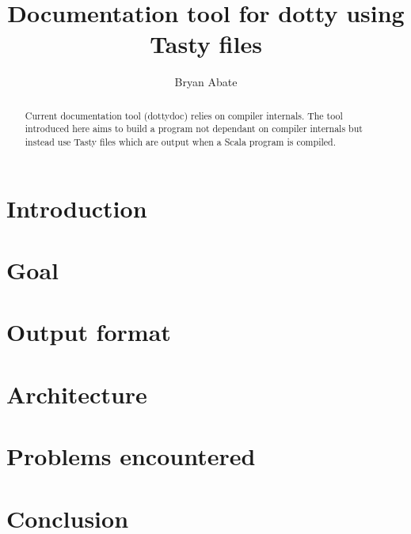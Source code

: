 \documentclass{report}
\begin{document}
\title{Documentation tool for dotty using Tasty files}
\author{Bryan Abate}

\maketitle

\begin{abstract}
Current documentation tool (dottydoc) relies on compiler internals. The tool introduced here aims to build a program not dependant on compiler internals but instead use Tasty files which are output when a Scala program is compiled.
\end{abstract}

\chapter{Introduction}

\chapter{Goal}

\chapter{Output format}

\chapter{Architecture}

\chapter{Problems encountered}

\chapter{Conclusion}
\end{document}
